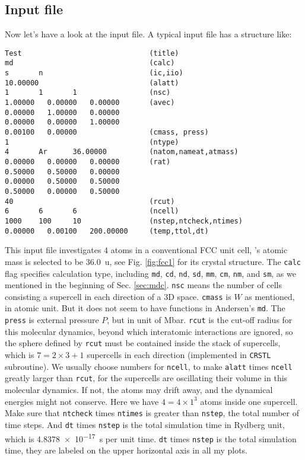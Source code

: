 
\subsection{Input file}

Now let's have a look at the input file.
A typical input file has a structure like:
\begin{verbatim}
Test                              (title)
md                                (calc)
s       n                         (ic,iio)
10.00000                          (alatt)
1       1       1                 (nsc)
1.00000   0.00000   0.00000       (avec)
0.00000   1.00000   0.00000
0.00000   0.00000   1.00000
0.00100   0.00000                 (cmass, press)
1                                 (ntype)
4       Ar      36.00000          (natom,nameat,atmass)
0.00000   0.00000   0.00000       (rat)
0.50000   0.50000   0.00000
0.00000   0.50000   0.50000
0.50000   0.00000   0.50000
40                                (rcut)
6       6       6                 (ncell)
1000    100     10                (nstep,ntcheck,ntimes)
0.00000   0.00100   200.00000     (temp,ttol,dt)
\end{verbatim}

This input file investigates $4$  atoms in a conventional FCC unit cell,
's atomic mass is selected to be \SI{36.0}{\atomicmassunit},
see Fig. \ref{fig:fcc1} for its crystal structure.
The \texttt{calc} flag specifies calculation type, including \texttt{md},
\texttt{cd}, \texttt{nd}, \texttt{sd}, \texttt{mm}, \texttt{cm}, \texttt{nm}, and \texttt{sm}, as we mentioned in the beginning of Sec. \ref{sec:mdc}.
\texttt{nsc} means the number of cells consisting a supercell in each direction of a 3D space.
\texttt{cmass} is $W$ as mentioned, in atomic unit. But it does not seem to have functions in Andersen's \texttt{md}.
The \texttt{press} is external pressure $P$, but in unit of \si{\mega\bar}.
\texttt{rcut} is the cut-off radius for this molecular dynamics, beyond which interatomic interactions are ignored, so the sphere defined by
\texttt{rcut} must be contained inside the stack of supercells, which is $7=2\times 3+1$ supercells in each direction (implemented in \texttt{CRSTL} subroutine). We usually choose numbers for \texttt{ncell}, to make
\texttt{alatt} times \texttt{ncell} greatly larger than \texttt{rcut}, for the supercells are
oscillating their volume in this molecular dynamics.
If not, the atoms may drift away, and the dynamical energies might not conserve.
Here we have $4=4 \times 1^3$ atoms inside one supercell.
Make sure that \texttt{ntcheck} times \texttt{ntimes} is greater than
\texttt{nstep}, the total number of time steps.
And \texttt{dt} times \texttt{nstep} is the total simulation time in Rydberg unit, which is
\SI{4.8378e-17}{\second} per unit time. \texttt{dt} times \texttt{nstep} is the total simulation time,
they are labeled on the upper horizontal axis in all my plots.

